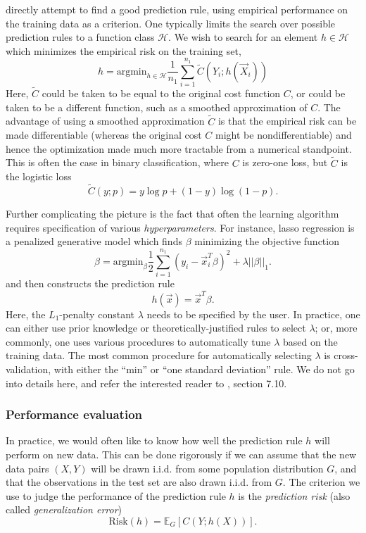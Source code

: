 \begin{itemize}
  directly attempt to find a good prediction rule, using empirical
  performance on the training data as a criterion. One typically
  limits the search over possible prediction rules to a function class
  $\mathcal{H}$.  We wish to search for an element $h \in \mathcal{H}$
  which minimizes the empirical risk on the training set,
\[
h = \text{argmin}_{h \in \mathcal{H}} \frac{1}{n_1} \sum_{i=1}^{n_1} \tilde{C}(Y_i; h(\vec{X}_i))
\]
Here, $\tilde{C}$ could be taken to be equal to the original cost
function $C$, or could be taken to be a different function, such as a
smoothed approximation of $C$.  The advantage of using a smoothed
approximation $\tilde{C}$ is that the empirical risk can be made
differentiable (whereas the original cost $C$ might be
nondifferentiable) and hence the optimization made much more tractable
from a numerical standpoint.  This is often the case in binary
classification, where $C$ is zero-one loss, but $\tilde{C}$ is the logistic loss
\[
\tilde{C}(y; p) = y \log p + (1-y) \log (1-p).
\]
\end{itemize}
Further complicating the picture is the fact that often the learning
algorithm requires specification of various \emph{hyperparameters}.
For instance, lasso regression is a penalized generative model which
finds $\beta$ minimizing the objective function
\[
\beta = \text{argmin}_\beta \frac{1}{2}\sum_{i=1}^{n_1}(y_i - \vec{x}_i^T \beta)^2 + \lambda ||\beta||_1.
\]
and then constructs the prediction rule
\[
h(\vec{x}) = \vec{x}^T \beta.
\]
Here, the $L_1$-penalty constant $\lambda$ needs to be specified by
the user.  In practice, one can either use prior knowledge or
theoretically-justified rules to select $\lambda$; or, more commonly,
one uses various procedures to automatically tune $\lambda$ based on
the training data.  The most common procedure for automatically
selecting $\lambda$ is cross-validation, with either the ``min'' or
``one standard deviation'' rule.  We do not go into details here, and
refer the interested reader to \cite{Hastie2009a}, section 7.10.

\subsubsection{Performance evaluation}

In practice, we would often like to know how well the prediction rule
$h$ will perform on new data.  This can be done rigorously if we can
assume that the new data pairs $(X, Y)$ will be drawn i.i.d. from some
population distribution $G$, and that the observations in the test set
are also drawn i.i.d. from $G$.  The criterion we use to judge the
performance of the prediction rule $h$ is the \emph{prediction risk} (also called \emph{generalization error})
\[
\text{Risk}(h) = \mathbb{E}_G[C(Y; h(X))].
\]

